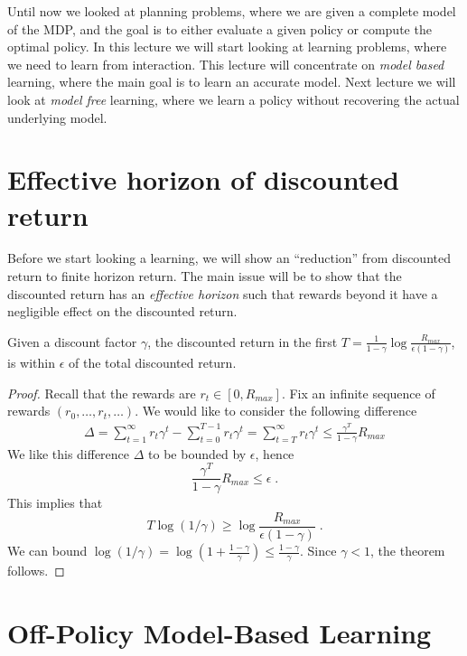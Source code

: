 Until now we looked at planning problems, where we are given a
complete model of the MDP, and the goal is to either evaluate a
given policy or compute the optimal policy. In this lecture we will
start looking at learning problems, where we need to learn from
interaction. This lecture will concentrate on {\em model based}
learning, where the main goal is to learn an accurate model. Next
lecture we will look at {\em model free} learning, where we learn a
policy without recovering the actual underlying model.

\section{Effective horizon of discounted return}

Before we start looking a learning, we will show an ``reduction''
from discounted return to finite horizon return. The main issue will
be to show that the discounted return has an {\em effective horizon}
such that rewards beyond it have a negligible effect on the
discounted return.

\begin{theorem}
Given a discount factor $\gamma$, the discounted return in the first
$T=\frac{1}{1-\gamma}\log \frac{R_{max}}{\epsilon(1-\gamma)}$, is
within $\epsilon$ of the total discounted return.
\end{theorem}

\begin{proof}
Recall that the rewards are $r_t \in [0,R_{max}]$. Fix an infinite
sequence of rewards $(r_0, \ldots , r_t, \ldots)$. We would like to
consider the following difference
\begin{align*}
\Delta=\sum_{t=1}^\infty r_t \gamma^t - \sum_{t=0}^{T-1} r_t
\gamma^t = \sum_{t=T}^\infty r_t \gamma^t \leq
\frac{\gamma^T}{1-\gamma}R_{max}
\end{align*}
We like this difference $\Delta$ to be bounded by $\epsilon$, hence
\[
\frac{\gamma^T}{1-\gamma}R_{max}\leq \epsilon\;.
\]
This implies that
\[
T\log (1/\gamma) \geq \log \frac{R_{max}}{\epsilon(1-\gamma)}\;.
\]
We can bound $\log (1/\gamma)= \log ( 1+\frac{1-\gamma}{\gamma}
)\leq \frac{1-\gamma}{\gamma}$. Since $\gamma< 1$, the theorem
follows.
\end{proof}

\section{Off-Policy Model-Based Learning}


